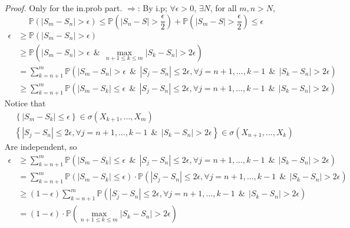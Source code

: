 \documentclass[a4paper,12pt,twoside]{book}
\begin{document}
\begin{itemize}
	\item[\textit{Proof.}] Only for the in.prob part. $\Rightarrow$:\newline
	By i.p; $\forall \epsilon>0$, $\exists N$, for all $m,n>N$, 
	\begin{equation}
		\mathbb{P}\left(|S_m-S_n|>\epsilon\right)\leq \mathbb{P}\left(|S_n-S|>\frac{\epsilon}{2}\right) + \mathbb{P}\left(|S_m-S|>\frac{\epsilon}{2}\right)\leq \epsilon
	\end{equation}
	\begin{equation}
		\begin{split}
			\epsilon
			&\geq \mathbb{P}\left(|S_m-S_n|>\epsilon\right)\\
			&\geq \mathbb{P}\left(|S_m-S_n|>\epsilon~~\&~~\max\limits_{n+1\leq k\leq m}|S_k-S_n|>2\epsilon\right)\\
			&= \sum_{k=n+1}^m\mathbb{P}\left(|S_m-S_n|>\epsilon~~\&~~|S_j-S_n|\leq2\epsilon, \forall j=n+1,...,k-1~~\&~~|S_k-S_n|>2\epsilon\right)\\
			&\geq \sum_{k=n+1}^m\mathbb{P}\left(|S_m-S_k|\leq\epsilon~~\&~~|S_j-S_n|\leq2\epsilon, \forall j=n+1,...,k-1~~\&~~|S_k-S_n|>2\epsilon\right)
		\end{split}
	\end{equation}
	Notice that 
	\begin{equation}
		\begin{split}
			&\left\{|S_m-S_k|\leq\epsilon\right\} \in \sigma(X_{k+1}, ... ,X_m)\\
			&\left\{|S_j-S_n|\leq2\epsilon, \forall j=n+1,...,k-1~~\&~~|S_k-S_n|>2\epsilon\right\} \in \sigma(X_{n+1}, ... ,X_k)
		\end{split}
	\end{equation}
	Are independent, so
	\begin{equation}
		\begin{split}
			\epsilon&\geq\sum_{k=n+1}^m\mathbb{P}\left(|S_m-S_k|\leq\epsilon~~\&~~|S_j-S_n|\leq2\epsilon, \forall j=n+1,...,k-1~~\&~~|S_k-S_n|>2\epsilon\right)\\
			&=\sum_{k=n+1}^m\mathbb{P}\left(|S_m-S_k|\leq\epsilon\right)\cdot\mathbb{P}\left(|S_j-S_n|\leq2\epsilon, \forall j=n+1,...,k-1~~\&~~|S_k-S_n|>2\epsilon\right)\\
			&\geq(1-\epsilon)\sum_{k=n+1}^m\mathbb{P}\left(|S_j-S_n|\leq2\epsilon, \forall j=n+1,...,k-1~~\&~~|S_k-S_n|>2\epsilon\right)\\
			&=(1-\epsilon)\cdot\mathbb{P}\left(\max\limits_{n+1\leq k\leq m}|S_k-S_n|>2\epsilon\right)
		\end{split}

\end{equation}
\end{itemize}
\end{document}
